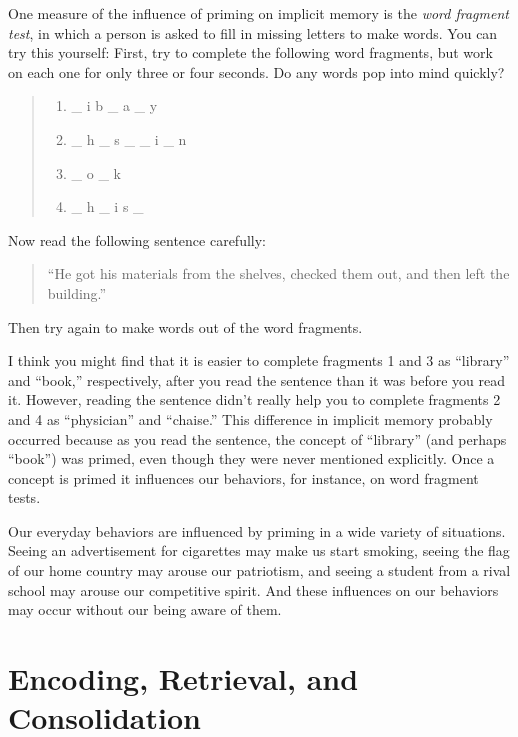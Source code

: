 \documentclass[
]{krantz}
\providecommand{\tightlist}{%
  \setlength{\itemsep}{0pt}\setlength{\parskip}{0pt}}
\begin{document}
One measure of the influence of priming on implicit memory is the \emph{word fragment test}, in which a person is asked to fill in missing letters to make words. You can try this yourself: First, try to complete the following word fragments, but work on each one for only three or four seconds. Do any words pop into mind quickly?

\begin{quote}
\begin{enumerate}
\def\labelenumi{\arabic{enumi}.}
\tightlist
\item
  \_ i b \_ a \_ y
\item
  \_ h \_ s \_ \_ i \_ n
\item
  \_ o \_ k
\item
  \_ h \_ i s \_
\end{enumerate}
\end{quote}

Now read the following sentence carefully:

\begin{quote}
``He got his materials from the shelves, checked them out, and then left the building.''
\end{quote}

Then try again to make words out of the word fragments.

I think you might find that it is easier to complete fragments 1 and 3 as ``library'' and ``book,'' respectively, after you read the sentence than it was before you read it. However, reading the sentence didn't really help you to complete fragments 2 and 4 as ``physician'' and ``chaise.'' This difference in implicit memory probably occurred because as you read the sentence, the concept of ``library'' (and perhaps ``book'') was primed, even though they were never mentioned explicitly. Once a concept is primed it influences our behaviors, for instance, on word fragment tests.

Our everyday behaviors are influenced by priming in a wide variety of situations. Seeing an advertisement for cigarettes may make us start smoking, seeing the flag of our home country may arouse our patriotism, and seeing a student from a rival school may arouse our competitive spirit. And these influences on our behaviors may occur without our being aware of them.

\section{Encoding, Retrieval, and Consolidation}\label{encoding-retrieval-and-consolidation}
\end{document}

